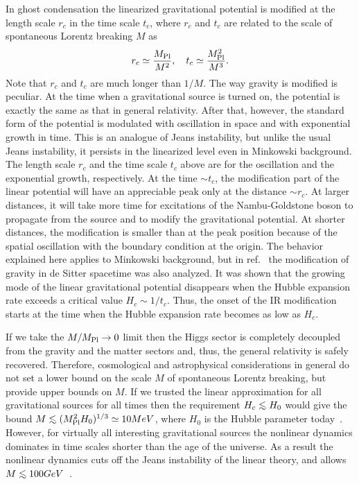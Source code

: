 In ghost condensation the linearized gravitational potential is modified
at the length scale $r_c$ in the time scale $t_c$, where $r_c$ and $t_c$
are related to the scale of spontaneous Lorentz breaking $M$ as
%
\begin{equation}
 r_c \simeq \frac{M_{\rm Pl}}{M^2}, \quad
 t_c \simeq \frac{M_{\rm Pl}^2}{M^3}. 
\end{equation}
Note that $r_c$ and $t_c$ are much longer than $1/M$. The way gravity is
modified is peculiar. At the time when a gravitational source is turned
on, the potential is exactly the same as that in general
relativity. After that, however, the standard form of the potential is
modulated with oscillation in space and with exponential growth in
time. This is an analogue of Jeans instability, but unlike the usual
Jeans instability, it persists in the linearized level even in Minkowski
background. The length scale $r_c$ and the time scale $t_c$ above are
for the oscillation and the exponential growth, respectively. At the
time $\sim t_c$, the modification part of the linear potential will have
an appreciable peak only at the distance $\sim r_c$. At larger
distances, it will take more time for excitations of the Nambu-Goldstone
boson to propagate from the source and to modify the gravitational
potential. At shorter distances, the modification is smaller than at the
peak position because of the spatial oscillation with the boundary
condition at the origin. The behavior explained here applies to
Minkowski background, but in ref.~\cite{Arkani-Hamed:2003uy} the
modification of gravity in de Sitter spacetime was also analyzed. It was
shown that the growing mode of the linear gravitational potential
disappears when the Hubble expansion rate exceeds a critical value
$H_c\sim 1/t_c$. Thus, the onset of the IR modification starts at the
time when the Hubble expansion rate becomes as low as $H_c$. 



If we take the $M/M_{\rm Pl}\to 0$ limit then the Higgs sector is
completely decoupled from the gravity and the matter sectors and, thus,
the general relativity is safely recovered. Therefore, cosmological and
astrophysical considerations in general do not set a lower bound on the
scale $M$ of spontaneous Lorentz breaking, but provide upper bounds on
$M$. If we trusted the linear approximation for all gravitational
sources for all times then the requirement $H_c \lsim H_0$ would give
the bound $M\lsim (M_{\rm Pl}^2H_0)^{1/3}\simeq 10 MeV$, where $H_0$ is
the Hubble parameter today~\cite{Arkani-Hamed:2003uy}. However, for
virtually all interesting gravitational sources the nonlinear dynamics
dominates in time scales shorter than the age of the universe. As a
result the nonlinear dynamics cuts off the Jeans instability of the
linear theory, and allows  $M\lsim 100 GeV$~\cite{Arkani-Hamed:2005gu}. 



